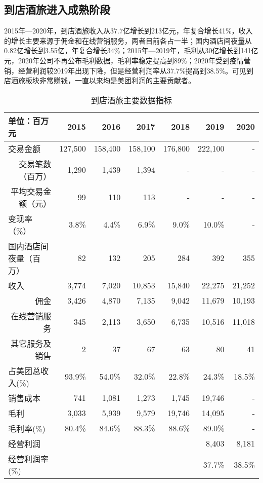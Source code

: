 \documentclass[UTF8,a4paper,12pt,lang=cn,fontset = windows]{elegantpaper} %
\begin{document}
\subsection{到店酒旅进入成熟阶段}
2015年—2020年，到店酒旅收入从37.7亿增长到213亿元，年复合增长41\%，收入的增长主要来源于佣金和在线营销服务，两者目前各占一半；国内酒店间夜量从0.82亿增长到3.55亿，年复合增长34\%；2015年—2019年，毛利从30亿增长到141亿元，2020年公司不再公布毛利数据，毛利率稳定提高到89\%；2020年受到疫情营销，经营利润较2019年出现下降，但是经营利润率从37.7\%提高到38.5\%。可见到店酒旅板块非常赚钱，一直以来均是美团利润的主要贡献者。
\begin{table}[htbp]
  \centering
  \caption{到店酒旅主要数据指标}
    \begin{tabular}{lrrrrrr}
      \toprule
    单位：百万元 & 2015  & 2016  & 2017  & 2018  & 2019  & 2020 \\
    \midrule
    交易金额  & 127,500  & 158,400  & 158,100  & 176,800  & 222,100  &           -    \\
    \multicolumn{1}{r}{交易笔数（百万）} & 1,290  & 1,439  & 1,394  &           -    &           -    &           -    \\
    \multicolumn{1}{r}{平均交易金额（元）} & 99    & 110   & 113   &           -    &           -    &           -    \\
    变现率（\%） & 3.8\% & 4.4\% & 6.9\% & 9.0\% & 10.0\% &           -    \\
    国内酒店间夜量（百万） & 82    & 132   & 205   &          284  &          392  &          355  \\
    收入    & 3,774  & 7,020  & 10,853  & 15,840  & 22,275  & 21,252  \\
    \multicolumn{1}{r}{佣金} & 3,426  & 4,870  & 7,135  & 9,042  & 11,679  & 10,193  \\
    \multicolumn{1}{r}{在线营销服务} & 345   & 2,113  & 3,650  & 6,735  & 10,516  & 11,018  \\
    \multicolumn{1}{r}{其它服务及销售} & 2     & 37    & 67    & 63    & 80    & 41  \\
    占美团总收入(\%) & 93.9\% & 54.0\% & 32.0\% & 22.8\% & 24.3\% & 18.5\% \\
    销售成本  & 741   & 1,081  & 1,273  & 1,745  & 19,746  &           -    \\
    毛利    & 3,033  & 5,939  & 9,579  & 19,746  & 14,095  &           -    \\
    毛利率(\%) & 80.4\% & 84.6\% & 88.3\% & 88.6\% & 89.0\% &           -    \\
    经营利润  &       &       &       &       & 8,403  & 8,181  \\
    经营利润率(\%) &       &       &       &       & 37.7\% & 38.5\% \\
    \bottomrule
    \end{tabular}%
  \label{tab:jiulv}%
\end{table}%
\end{document}
